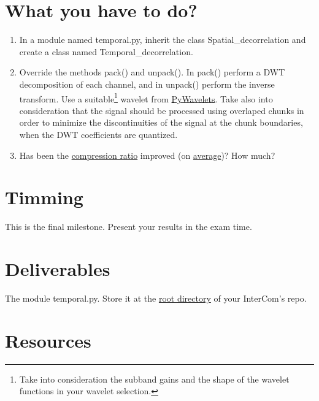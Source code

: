 \section{What you have to do?}

\begin{enumerate}
\item In a module named temporal.py, inherit the class
  Spatial\_decorrelation and create a class named Temporal\_decorrelation.
\item Override the methods pack() and unpack(). In pack() perform a
  DWT decomposition of each channel, and in unpack() perform the
  inverse transform. Use a suitable\footnote{Take into consideration
    the subband gains and the shape of the wavelet functions in your
    wavelet selection.} wavelet from
  \href{https://pywavelets.readthedocs.io/en/latest/}{PyWavelets}. Take
  also into consideration that the signal should be processed using
  overlaped chunks in order to minimize the discontinuities of the
  signal at the chunk boundaries, when the DWT coefficients are
  quantized.
\item Has been the
  \href{https://en.wikipedia.org/wiki/Data_compression_ratio}{compression
    ratio} improved (on
  \href{https://en.wikipedia.org/wiki/Average}{average})? How much?
\end{enumerate}

\section{Timming}

This is the final milestone. Present your results in the exam time.

\section{Deliverables}

The module temporal.py. Store it at the
\href{https://github.com/Tecnologias-multimedia/intercom}{root
  directory} of your InterCom's repo.

\section{Resources}




